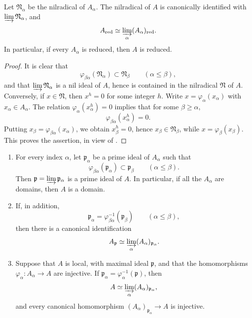 \begin{corollary}[5.13.2]
\label{IV.5.13.2}
Let $\mathfrak N_\alpha$ be the nilradical of $A_\alpha$.  The
nilradical of $A$ is canonically identified with
$\varinjlim\mathfrak N_\alpha$, and
\[
  A_{\mathrm{red}}
  \simeq
  \varinjlim_\alpha(A_\alpha)_{\mathrm{red}}.
\]
In particular, if every $A_\alpha$ is reduced, then $A$ is
reduced.
\end{corollary}


\begin{proof}
It is clear that
\[
  \varphi_{\beta\alpha}(\mathfrak N_\alpha)
  \subset\mathfrak N_\beta
  \qquad(\alpha\leq\beta),
\]
and that $\varinjlim\mathfrak N_\alpha$ is a nil ideal of $A$,
hence is contained in the nilradical $\mathfrak N$ of $A$.
Conversely, if $x\in\mathfrak N$, then $x^h=0$ for some integer
$h$.  Write $x=\varphi_\alpha(x_\alpha)$ with
$x_\alpha\in A_\alpha$.  The relation
$\varphi_\alpha(x_\alpha^h)=0$ implies that for some
$\beta\geq\alpha$,
\[
  \varphi_{\beta\alpha}(x_\alpha^h)=0.
\]
Putting $x_\beta=\varphi_{\beta\alpha}(x_\alpha)$, we obtain
$x_\beta^h=0$, hence $x_\beta\in\mathfrak N_\beta$, while
$x=\varphi_\beta(x_\beta)$.  This proves the assertion, in view
of .
\end{proof}

\begin{proposition}[5.13.3]
\label{IV.5.13.3}
\begin{enumerate}[{\rm(i)}]
  \item For every index $\alpha$, let $\mathfrak p_\alpha$ be a
  prime ideal of $A_\alpha$ such that
  \[
    \varphi_{\beta\alpha}(\mathfrak p_\alpha)
    \subset\mathfrak p_\beta
    \qquad(\alpha\leq\beta).
  \]
  Then $\mathfrak p=\varinjlim\mathfrak p_\alpha$ is a prime
  ideal of $A$.  In particular, if all the $A_\alpha$ are
  domains, then $A$ is a domain.

  \item If, in addition,
  \[
    \mathfrak p_\alpha
    =\varphi_{\beta\alpha}^{-1}(\mathfrak p_\beta)
    \qquad(\alpha\leq\beta),
  \]
  then there is a canonical identification
  \[
    A_{\mathfrak p}
    \simeq
    \varinjlim_\alpha(A_\alpha)_{\mathfrak p_\alpha}.
  \]

  \item Suppose that $A$ is local, with maximal ideal
  $\mathfrak p$, and that the homomorphisms
  $\varphi_\alpha:A_\alpha\to A$ are injective.  If
  $\mathfrak p_\alpha=\varphi_\alpha^{-1}(\mathfrak p)$, then
  \[
    A
    \simeq
    \varinjlim_\alpha(A_\alpha)_{\mathfrak p_\alpha},
  \]
  and every canonical homomorphism
  $(A_\alpha)_{\mathfrak p_\alpha}\to A$ is injective.
\end{enumerate}
\end{proposition}

